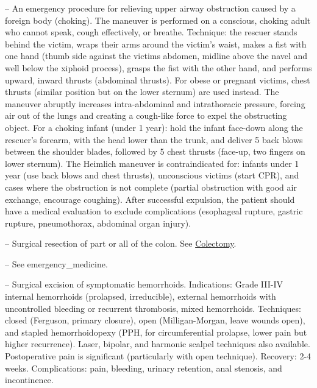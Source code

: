 -- An emergency procedure for relieving upper airway obstruction caused by a foreign body (choking). The maneuver is performed on a conscious, choking adult who cannot speak, cough effectively, or breathe. Technique: the rescuer stands behind the victim, wraps their arms around the victim's waist, makes a fist with one hand (thumb side against the victims abdomen, midline above the navel and well below the xiphoid process), grasps the fist with the other hand, and performs upward, inward thrusts (abdominal thrusts). For obese or pregnant victims, chest thrusts (similar position but on the lower sternum) are used instead. The maneuver abruptly increases intra-abdominal and intrathoracic pressure, forcing air out of the lungs and creating a cough-like force to expel the obstructing object. For a choking infant (under 1 year): hold the infant face-down along the rescuer's forearm, with the head lower than the trunk, and deliver 5 back blows between the shoulder blades, followed by 5 chest thrusts (face-up, two fingers on lower sternum). The Heimlich maneuver is contraindicated for: infants under 1 year (use back blows and chest thrusts), unconscious victims (start CPR), and cases where the obstruction is not complete (partial obstruction with good air exchange, encourage coughing). After successful expulsion, the patient should have a medical evaluation to exclude complications (esophageal rupture, gastric rupture, pneumothorax, abdominal organ injury).

-- Surgical resection of part or all of the colon. See \hyperlink{Colectomy}{Colectomy}.

-- See emergency\_medicine.

-- Surgical excision of symptomatic hemorrhoids. Indications: Grade III-IV internal hemorrhoids (prolapsed, irreducible), external hemorrhoids with uncontrolled bleeding or recurrent thrombosis, mixed hemorrhoids. Techniques: closed (Ferguson, primary closure), open (Milligan-Morgan, leave wounds open), and stapled hemorrhoidopexy (PPH, for circumferential prolapse, lower pain but higher recurrence). Laser, bipolar, and harmonic scalpel techniques also available. Postoperative pain is significant (particularly with open technique). Recovery: 2-4 weeks. Complications: pain, bleeding, urinary retention, anal stenosis, and incontinence.


